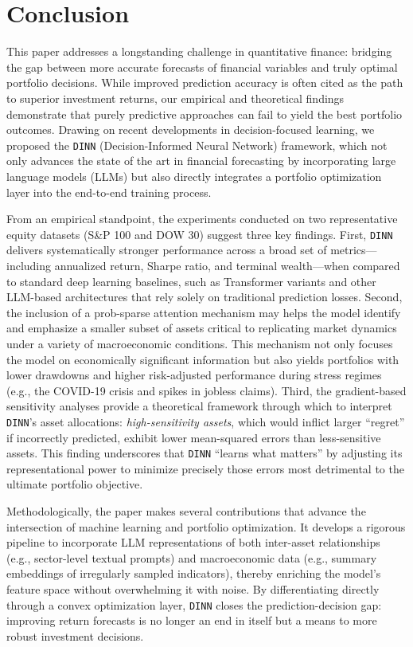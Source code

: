 \section{Conclusion} This paper addresses a longstanding challenge in quantitative finance: bridging the gap between more accurate forecasts of financial variables and truly optimal portfolio decisions. While improved prediction accuracy is often cited as the path to superior investment returns, our empirical and theoretical findings demonstrate that purely predictive approaches can fail to yield the best portfolio outcomes. Drawing on recent developments in decision-focused learning, we proposed the \texttt{\texttt{DINN}} (Decision-Informed Neural Network) framework, which not only advances the state of the art in financial forecasting by incorporating large language models (LLMs) but also directly integrates a portfolio optimization layer into the end-to-end training process.

From an empirical standpoint, the experiments conducted on two representative equity datasets (S\&P 100 and DOW 30) suggest three key findings. First, \texttt{DINN} delivers systematically stronger performance across a broad set of metrics—including annualized return, Sharpe ratio, and terminal wealth—when compared to standard deep learning baselines, such as Transformer variants and other LLM-based architectures that rely solely on traditional prediction losses. Second, the inclusion of a prob-sparse attention mechanism may helps the model identify and emphasize a smaller subset of assets critical to replicating market dynamics under a variety of macroeconomic conditions. This mechanism not only focuses the model on economically significant information but also yields portfolios with lower drawdowns and higher risk-adjusted performance during stress regimes (e.g., the COVID-19 crisis and spikes in jobless claims). Third, the gradient-based sensitivity analyses provide a theoretical framework through which to interpret \texttt{DINN}’s asset allocations: \textit{high-sensitivity assets}, which would inflict larger “regret” if incorrectly predicted, exhibit lower mean-squared errors than less-sensitive assets. This finding underscores that \texttt{DINN} “learns what matters” by adjusting its representational power to minimize precisely those errors most detrimental to the ultimate portfolio objective.

Methodologically, the paper makes several contributions that advance the intersection of machine learning and portfolio optimization. It develops a rigorous pipeline to incorporate LLM representations of both inter-asset relationships (e.g., sector-level textual prompts) and macroeconomic data (e.g., summary embeddings of irregularly sampled indicators), thereby enriching the model’s feature space without overwhelming it with noise. By differentiating directly through a convex optimization layer, \texttt{DINN} closes the prediction-decision gap: improving return forecasts is no longer an end in itself but a means to more robust investment decisions.

